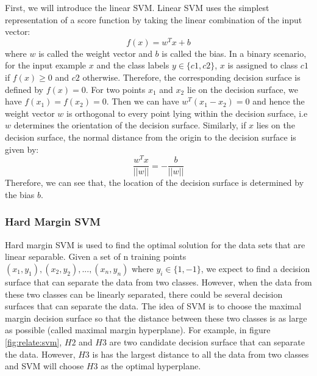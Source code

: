 First, we will introduce the linear SVM. Linear SVM uses the simplest representation of a score function by taking the linear combination of the input vector:
\begin{equation}\label{eq:relation:score}
f(x) = w^Tx+b
\end{equation}
where $w$ is called the weight vector and $b$ is called the bias. In a binary scenario, for the input example $x$ and the class labels $y \in \{c1,c2\}$, $x$ is assigned to class $c1$ if $f(x) \geq 0$ and $c2$  otherwise. Therefore, the corresponding decision surface is defined by $f(x)=0$. For two points $x_1$ and $x_2$ lie on the decision surface, we have $f(x_1)=f(x_2)=0$. Then we can have $w^T(x_1-x_2)=0$ and hence the weight vector $w$ is orthogonal to every point lying within the decision surface, i.e $w$ determines the orientation of the decision surface. Similarly, if $x$ lies on the decision surface, the normal distance from the origin to the decision surface is given by:
\begin{equation}
\frac{w^Tx}{||w||}=-\frac{b}{||w||}
\end{equation}
Therefore, we can see that, the location of the decision surface is determined by the bias $b$.
\subsubsection{Hard Margin SVM}
Hard margin SVM is used to find the optimal solution for the data sets that are linear separable. 
Given a set of n training points $(x_1,y_1),(x_2,y_2),...,(x_n,y_n)$ where $y_i \in \{1,-1\}$, we expect to find a decision surface that can separate the data from two classes. However, when the data from these two classes can be linearly separated, there could be several decision surfaces that can separate the data. The idea of SVM is to choose the maximal margin decision surface so that the distance between these two classes is as large as possible (called maximal margin hyperplane). For example, in figure \ref{fig:relate:svm}, $H2$ and $H3$ are two candidate decision surface that can separate the data. However, $H3$ is has the largest distance to all the data from two classes and SVM will choose $H3$ as the optimal hyperplane. 

